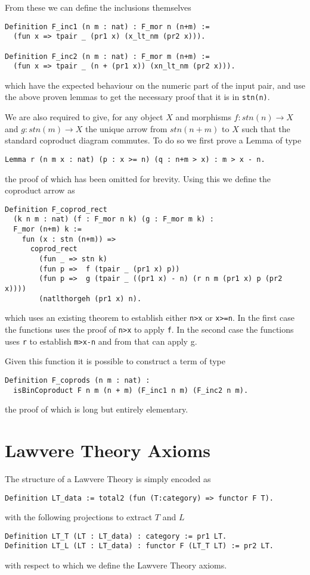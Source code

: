 From these we can define the inclusions themselves
\begin{lstlisting}
Definition F_inc1 (n m : nat) : F_mor n (n+m) := 
  (fun x => tpair _ (pr1 x) (x_lt_nm (pr2 x))).

Definition F_inc2 (n m : nat) : F_mor m (n+m) := 
  (fun x => tpair _ (n + (pr1 x)) (xn_lt_nm (pr2 x))).
\end{lstlisting}
which have the expected behaviour on the numeric part of the input pair, and use
the above proven lemmas to get the necessary proof that it is in \verb|stn(n)|.

We are also required to give, for any object $X$ and morphisms $f: stn(n)\to X$
and $g: stn(m)\to X$ the unique arrow from $stn(n+m)$ to $X$ such that the
standard coproduct diagram commutes. To do so we first prove a Lemma of type
\begin{lstlisting}
Lemma r (n m x : nat) (p : x >= n) (q : n+m > x) : m > x - n.
\end{lstlisting}
the proof of which has been omitted for brevity. Using this we define the
coproduct arrow as
\begin{lstlisting}
Definition F_coprod_rect 
  (k n m : nat) (f : F_mor n k) (g : F_mor m k) : 
  F_mor (n+m) k :=
    fun (x : stn (n+m)) => 
      coprod_rect 
        (fun _ => stn k)
        (fun p =>  f (tpair _ (pr1 x) p))
        (fun p =>  g (tpair _ ((pr1 x) - n) (r n m (pr1 x) p (pr2 x))))
        (natlthorgeh (pr1 x) n).
\end{lstlisting}
which uses an existing theorem to establish either \verb|n>x| or \verb|x>=n|. In
the first case the functions uses the proof of \verb|n>x| to apply \verb|f|. In
the second case the functions uses \verb|r| to establish \verb|m>x-n| and from
that can apply g.

Given this function it is possible to construct a term of type
\begin{lstlisting}
Definition F_coprods (n m : nat) : 
  isBinCoproduct F n m (n + m) (F_inc1 n m) (F_inc2 n m).
\end{lstlisting}
the proof of which is long but entirely elementary.

\section{Lawvere Theory Axioms}
The structure of a Lawvere Theory is simply encoded as
\begin{lstlisting}
Definition LT_data := total2 (fun (T:category) => functor F T).
\end{lstlisting}
with the following projections to extract $T$ and $L$
\begin{lstlisting}
Definition LT_T (LT : LT_data) : category := pr1 LT.
Definition LT_L (LT : LT_data) : functor F (LT_T LT) := pr2 LT.
\end{lstlisting}
with respect to which we define the Lawvere Theory axioms.


